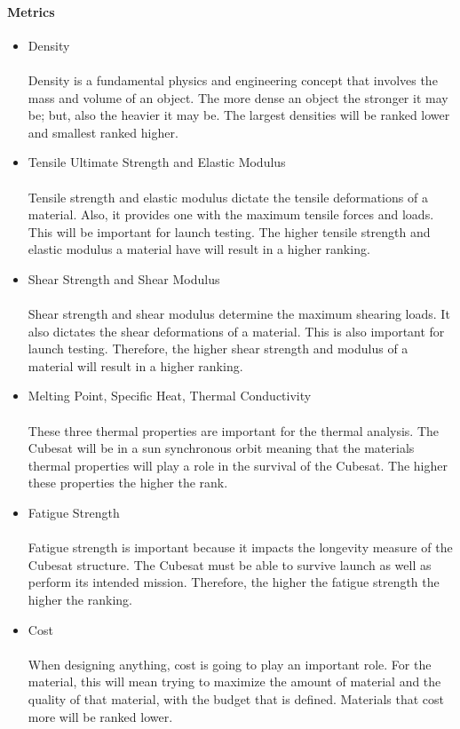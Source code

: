 \paragraph{Metrics}
\begin{itemize}
\item{Density}\\
\\
Density is a fundamental physics and engineering concept that involves the mass and volume of an object. The more dense an object the stronger it may be; but, also the heavier it may be. The largest densities will be ranked lower and smallest ranked higher. 
\item{Tensile Ultimate Strength and Elastic Modulus}\\
\\
Tensile strength and elastic modulus dictate the tensile deformations of a material. Also, it provides one with the maximum tensile forces and loads. This will be important for launch testing. The higher tensile strength and elastic modulus a material have will result in a higher ranking.
\item{Shear Strength and Shear Modulus}\\
\\
Shear strength and shear modulus determine the maximum shearing loads. It also dictates the shear deformations of a material. This is also important for launch testing. Therefore, the higher shear strength and modulus of a material will result in a higher ranking. 
\item{Melting Point, Specific Heat, Thermal Conductivity}\\
\\
These three thermal properties are important for the thermal analysis. The Cubesat will be in a sun synchronous orbit meaning that the materials thermal properties will play a role in the survival of the Cubesat. The higher these properties the higher the rank. 
\item{Fatigue Strength}\\
\\
Fatigue strength is important because it impacts the longevity measure of the Cubesat structure. The Cubesat must be able to survive launch as well as perform its intended mission. Therefore, the higher the fatigue strength the higher the ranking. 
\item{Cost}\\
\\
When designing anything, cost is going to play an important role. For the material, this will mean trying to maximize the amount of material and the quality of that material, with the budget that is defined. Materials that cost more will be ranked lower. 
\end{itemize}


